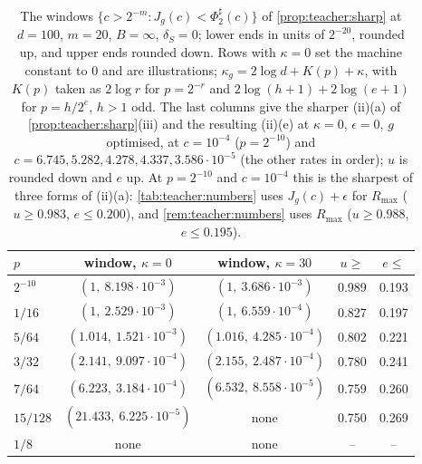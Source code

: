\begin{table}[!ht]
\centering\small
\begin{tabular}{@{}l|cc|cc@{}}
\toprule
$p$ & window, $\kappa=0$ & window, $\kappa=30$ & $u\ge$ & $e\le$\\
\midrule
$2^{-10}$ & $(1,\ 8.198\cdot10^{-3})$ & $(1,\ 3.686\cdot10^{-3})$ & 0.989 & 0.193\\
$1/16$ & $(1,\ 2.529\cdot10^{-3})$ & $(1,\ 6.559\cdot10^{-4})$ & 0.827 & 0.197\\
$5/64$ & $(1.014,\ 1.521\cdot10^{-3})$ & $(1.016,\ 4.285\cdot10^{-4})$ & 0.802 & 0.221\\
$3/32$ & $(2.141,\ 9.097\cdot10^{-4})$ & $(2.155,\ 2.487\cdot10^{-4})$ & 0.780 & 0.241\\
$7/64$ & $(6.223,\ 3.184\cdot10^{-4})$ & $(6.532,\ 8.558\cdot10^{-5})$ & 0.759 & 0.260\\
$15/128$ & $(21.433,\ 6.225\cdot10^{-5})$ & none & 0.750 & 0.269\\
$1/8$ & none & none & -- & --\\
\bottomrule
\end{tabular}
\caption{The windows $\{c>2^{-m}:J_g(c)<\Phi_2^\sharp(c)\}$ of \cref{prop:teacher:sharp} at $d=100$, $m=20$, $B=\infty$, $\delta_S=0$; lower ends in units of $2^{-20}$, rounded up, and upper ends rounded down. Rows with $\kappa=0$ set the machine constant to $0$ and are illustrations; $\kappa_g=2\log d+K(p)+\kappa$, with $K(p)$ taken as $2\log r$ for $p=2^{-r}$ and $2\log(h+1)+2\log(e+1)$ for $p=h/2^e$, $h>1$ odd. The last columns give the sharper (ii)(a) of \cref{prop:teacher:sharp}(iii) and the resulting (ii)(e) at $\kappa=0$, $\epsilon=0$, $g$ optimised, at $c=10^{-4}$ ($p=2^{-10}$) and $c=6.745,5.282,4.278,4.337,3.586\cdot10^{-5}$ (the other rates in order); $u$ is rounded down and $e$ up. At $p=2^{-10}$ and $c=10^{-4}$ this is the sharpest of three forms of (ii)(a): \cref{tab:teacher:numbers} uses $J_g(c)+\epsilon$ for $R_{\max}$ ($u\ge0.983$, $e\le0.200$), and \cref{rem:teacher:numbers} uses $R_{\max}$ ($u\ge0.988$, $e\le0.195$).}
\label{tab:teacher:rates}
\end{table}

